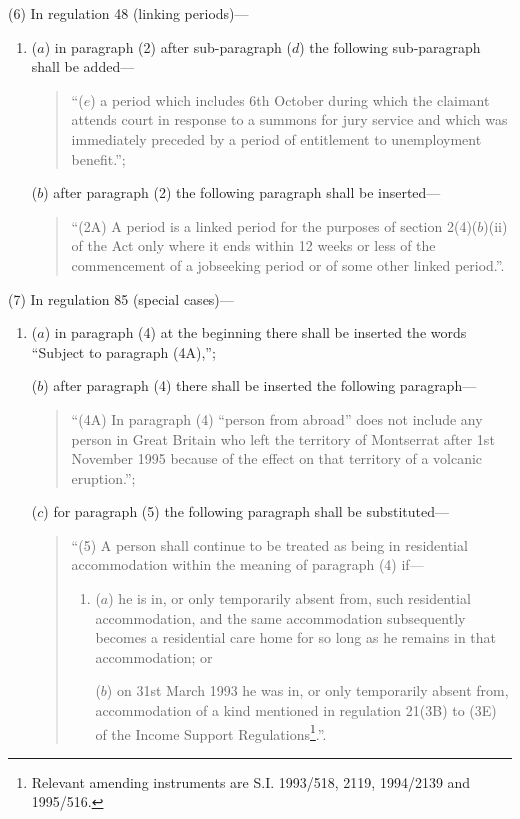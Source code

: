 \documentclass[a4paper]{article}
\begin{document}
(6) In regulation 48 (linking periods)—
\begin{enumerate}\item[]
($a$) in paragraph (2) after sub-paragraph ($d$) the following sub-paragraph shall be added—
\begin{quotation}
“($e$) a period which includes 6th October during which the claimant attends court in response to a summons for jury service and which was immediately preceded by a period of entitlement to unemployment benefit.”;
\end{quotation}

($b$) after paragraph (2) the following paragraph shall be inserted—
\begin{quotation}
“(2A) A period is a linked period for the purposes of section 2(4)($b$)(ii) of the Act only where it ends within 12 weeks or less of the commencement of a jobseeking period or of some other linked period.”.
\end{quotation}
\end{enumerate}

(7) In regulation 85 (special cases)—
\begin{enumerate}\item[]
($a$) in paragraph (4) at the beginning there shall be inserted the words “Subject to paragraph (4A),”;

($b$) after paragraph (4) there shall be inserted the following paragraph—
\begin{quotation}
“(4A) In paragraph (4) “person from abroad” does not include any person in Great Britain who left the territory of Montserrat after 1st November 1995 because of the effect on that territory of a volcanic eruption.”;
\end{quotation}

($c$) for paragraph (5) the following paragraph shall be substituted—
\begin{quotation}
“(5) A person shall continue to be treated as being in residential accommodation within the meaning of paragraph (4) if—
\begin{enumerate}\item[]
($a$) he is in, or only temporarily absent from, such residential accommodation, and the same accommodation subsequently becomes a residential care home for so long as he remains in that accommodation; or

($b$) on 31st March 1993 he was in, or only temporarily absent from, accommodation of a kind mentioned in regulation 21(3B) to (3E) of the Income Support Regulations\footnote{\frenchspacing Relevant amending instruments are S.I. 1993/518, 2119, 1994/2139 and 1995/516.}.”.
\end{enumerate}
\end{quotation}
\end{enumerate}
\end{document}
